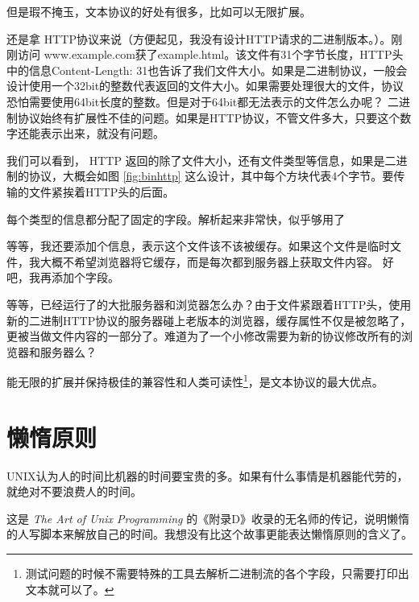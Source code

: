\documentclass[amstex,twoside]{ctexbook}
\begin{document}
但是瑕不掩玉，文本协议的好处有很多，比如可以无限扩展。

还是拿 HTTP协议来说（方便起见，我没有设计HTTP请求的二进制版本。）。刚刚访问 www.example.com获了example.html。该文件有31个字节长度，HTTP头中的信息Content-Length: 31也告诉了我们文件大小。如果是二进制协议，一般会设计使用一个32bit的整数代表返回的文件大小。如果需要处理很大的文件，协议恐怕需要使用64bit长度的整数。但是对于64bit都无法表示的文件怎么办呢？ 二进制协议始终有扩展性不佳的问题。如果是HTTP协议，不管文件多大，只要这个数字还能表示出来，就没有问题。

我们可以看到， HTTP 返回的除了文件大小，还有文件类型等信息，如果是二进制的协议，大概会如图 \ref{fig:binhttp} 这么设计，其中每个方块代表4个字节。要传输的文件紧挨着HTTP头的后面。


每个类型的信息都分配了固定的字段。解析起来非常快，似乎够用了

等等，我还要添加个信息，表示这个文件该不该被缓存。如果这个文件是临时文件，我大概不希望浏览器将它缓存，而是每次都到服务器上获取文件内容。
好吧，我再添加个字段。


等等，已经运行了的大批服务器和浏览器怎么办？由于文件紧跟着HTTP头，使用新的二进制HTTP协议的服务器碰上老版本的浏览器，缓存属性不仅是被忽略了，更被当做文件内容的一部分了。难道为了一个小修改需要为新的协议修改所有的浏览器和服务器么？

能无限的扩展并保持极佳的兼容性和人类可读性\footnote{测试问题的时候不需要特殊的工具去解析二进制流的各个字段，只需要打印出文本就可以了。}，是文本协议的最大优点。

\section{懒惰原则}

UNIX认为人的时间比机器的时间要宝贵的多。如果有什么事情是机器能代劳的，就绝对不要浪费人的时间。

这是 \textit{The Art of Unix Programming} 的《附录D》收录的无名师的传记，说明懒惰的人写脚本来解放自己的时间。我想没有比这个故事更能表达懒惰原则的含义了。
\end{document}
